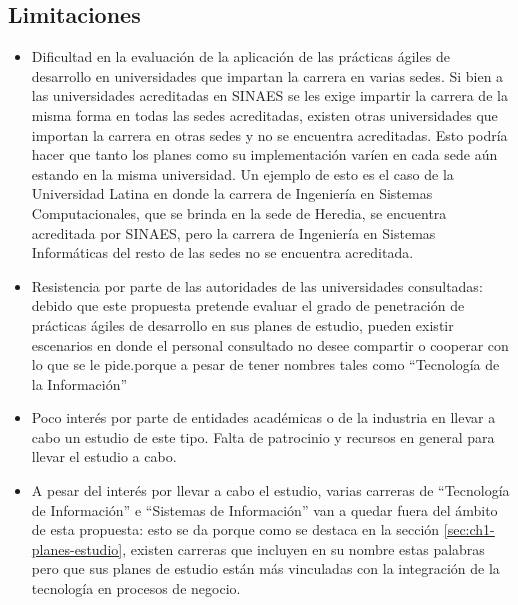 \subsection{Limitaciones}
\begin{itemize}
    \item Dificultad en la evaluación de la aplicación de las prácticas ágiles de desarrollo en universidades que impartan la carrera en varias sedes. Si bien a las universidades acreditadas en SINAES se les exige impartir la carrera de la misma forma en todas las sedes acreditadas, existen otras universidades que importan la carrera en otras sedes y no se encuentra acreditadas. Esto podría hacer que tanto los planes como su implementación varíen en cada sede aún estando en la misma universidad. Un ejemplo de esto es el caso de la Universidad Latina en donde la carrera de Ingeniería en Sistemas Computacionales, que se brinda en la sede de Heredia, se encuentra acreditada por SINAES, pero la carrera de Ingeniería en Sistemas Informáticas del resto de las sedes no se encuentra acreditada.
    \item Resistencia por parte de las autoridades de las universidades consultadas: debido que este propuesta pretende evaluar el grado de penetración de prácticas ágiles de desarrollo en sus planes de estudio, pueden existir escenarios en donde el personal consultado no desee compartir  o cooperar con lo que se le pide.porque a pesar de tener nombres tales como ``Tecnología de la Información'' 
    \item Poco interés por parte de entidades académicas o de la industria en llevar a cabo un estudio de este tipo. Falta de patrocinio y recursos en general para llevar el estudio a cabo. 
    \item A pesar del interés por llevar a cabo el estudio,  varias carreras de ``Tecnología de Información'' e ``Sistemas de Información'' van a quedar fuera del ámbito de esta propuesta: esto se da porque como se destaca en la sección \ref{sec:ch1-planes-estudio}, existen carreras que incluyen en su nombre estas palabras pero que sus planes de estudio están más vinculadas con la integración de la tecnología en procesos de negocio. 
\end{itemize}



